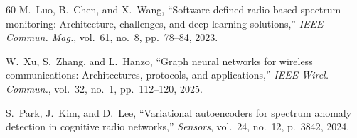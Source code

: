 \documentclass[sensors,article,submit,pdftex]{mdpi}
\begin{document}
\begin{thebibliography}{60}
M.~Luo, B.~Chen, and X.~Wang, ``Software-defined radio based spectrum monitoring: Architecture, challenges, and deep learning solutions,'' \textit{IEEE Commun. Mag.}, vol.~61, no.~8, pp.~78--84, 2023.

W.~Xu, S.~Zhang, and L.~Hanzo, ``Graph neural networks for wireless communications: Architectures, protocols, and applications,'' \textit{IEEE Wirel. Commun.}, vol.~32, no.~1, pp.~112--120, 2025.

S.~Park, J.~Kim, and D.~Lee, ``Variational autoencoders for spectrum anomaly detection in cognitive radio networks,'' \textit{Sensors}, vol.~24, no.~12, p.~3842, 2024.

\end{thebibliography}
\end{document}
